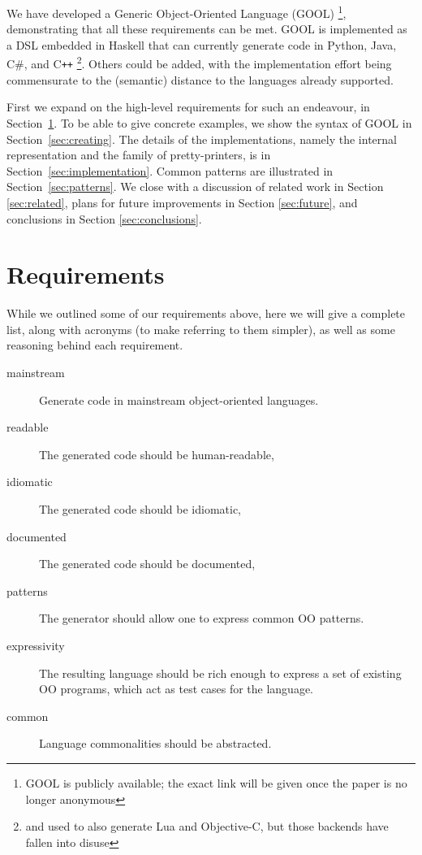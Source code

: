 \documentclass[sigplan,review,anonymous,prologue,dvipsnames]{acmart}
\newcommand{\Csharp}{C\#}
\newcommand{\Cplusplus}{C\texttt{++}}
\begin{document}
We have developed a Generic Object-Oriented Language (GOOL)%
\footnote{GOOL is publicly available; the exact link will be
given once the paper is no longer anonymous}, demonstrating that all these
requirements can be met.  GOOL is implemented as a DSL embedded in Haskell that
can currently generate code in Python, Java, \Csharp, and \Cplusplus%
\footnote{and used to also generate Lua and Objective-C, but those backends
have fallen into disuse}. Others could be added, with the implementation
effort being commensurate to the (semantic) distance to the languages
already supported.

First we expand on the high-level requirements for such an endeavour, in
Section~\ref{sec:req}.  To be able to give concrete examples, we
show the syntax of GOOL in Section~\ref{sec:creating}. The details of
the implementations, namely the internal representation and the
family of pretty-printers, is in Section~\ref{sec:implementation}.
Common patterns are illustrated in Section~\ref{sec:patterns}.  We
close with a discussion of related work in Section \ref{sec:related}, plans for
future improvements in Section \ref{sec:future}, and conclusions in Section
\ref{sec:conclusions}.

\section{Requirements} \label{sec:req}

While we outlined some of our requirements above, here we will give a
complete list, along with acronyms (to make referring to them simpler),
as well as some reasoning behind each requirement.

\begin{description}
\item[mainstream] Generate code in mainstream object-oriented languages.
\item[readable] The generated code should be human-readable,
\item[idiomatic] The generated code should be idiomatic,
\item[documented] The generated code should be documented,
\item[patterns] The generator should allow one to express common OO patterns.
\item[expressivity] The resulting language should be rich enough to express a
set of existing OO programs, which act as test cases for the language.
\item[common] Language commonalities should be abstracted.
\end{description}
\end{document}
